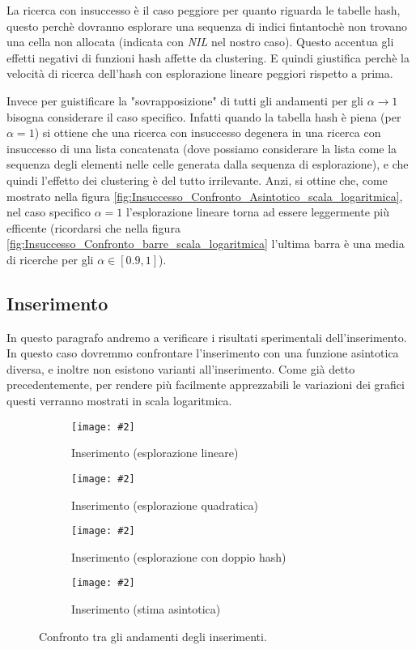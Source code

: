 \documentclass{article}
\newcommand{\image}[3][1]{
	\centering
	\texttt{[image: \#2]}
	\caption{#3}
}
\begin{document}
La ricerca con insuccesso è il caso peggiore per quanto riguarda le tabelle hash, questo perchè dovranno esplorare una sequenza di indici fintantochè non trovano una cella non allocata (indicata con \emph{NIL} nel nostro caso). Questo accentua gli effetti negativi di funzioni hash affette da clustering. E quindi giustifica perchè la velocità di ricerca dell'hash con esplorazione lineare peggiori rispetto a prima.

Invece per guistificare la "sovrapposizione" di tutti gli andamenti per gli $\alpha \longrightarrow 1$ bisogna considerare il caso specifico. Infatti quando la tabella hash è piena (per $\alpha = 1$) si ottiene che una ricerca con insuccesso degenera in una ricerca con insuccesso di una lista concatenata (dove possiamo considerare la lista come la sequenza degli elementi nelle celle generata dalla sequenza di esplorazione), e che quindi l'effetto dei clustering è del tutto irrilevante. Anzi, si ottine che, come mostrato nella figura \ref{fig:Insuccesso_Confronto_Asintotico_scala_logaritmica}, nel caso specifico $\alpha = 1$ l'esplorazione lineare torna ad essere leggermente più efficente (ricordarsi che nella figura \ref{fig:Insuccesso_Confronto_barre_scala_logaritmica} l'ultima barra è una media di ricerche per gli $\alpha \in [0.9, 1]$).

\subsection{Inserimento}
In questo paragrafo andremo a verificare i risultati sperimentali dell'inserimento. In questo caso dovremmo confrontare l'inserimento con una funzione asintotica diversa, e inoltre non esistono varianti all'inserimento. Come già detto precedentemente, per rendere più facilmente apprezzabili le variazioni dei grafici questi verranno mostrati in scala logaritmica.

\begin{figure}[H]
\begin{subfigure}[b]{0.5\textwidth}
\image{Inserimento_Lineare_scala_logaritmica}{Inserimento (esplorazione lineare)}
\end{subfigure}
\begin{subfigure}[b]{0.5\textwidth}
\image{Inserimento_Quadratico_scala_logaritmica}{Inserimento (esplorazione quadratica)}
\end{subfigure}
\begin{subfigure}[b]{0.5\textwidth}
\image{Inserimento_Doppio_scala_logaritmica}{Inserimento (esplorazione con doppio hash)}
\end{subfigure}
\begin{subfigure}[b]{0.5\textwidth}
\image{Inserimento_Asintotica_scala_logaritmica}{Inserimento (stima asintotica)}
\end{subfigure}
\caption{Confronto tra gli andamenti degli inserimenti.}
\label{fig:Inserimento_quartetto}
\end{figure}
\end{document}
